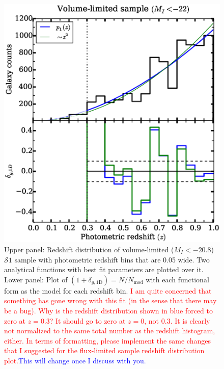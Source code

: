 \documentclass[twocolumn,useAMS,usenatbib]{mn2e}
\newcommand{\rachel}[1]{{\textcolor{red}{#1}}}
\newcommand{\arun}[1]{{\textcolor{blue}{#1}}}
\newcommand{\s}{\ensuremath{\mathcal{S}}}
\begin{document}
\begin{figure}
 \centering
  \includegraphics[width=\columnwidth]{redshift_vollimited}
  \caption{
Upper panel: Redshift distribution of volume-limited ($M_I <  -20.8$)
\s$1$ sample with photometric redshift bins that are 0.05 wide. Two
analytical functions with best fit parameters are plotted over it. 
           Lower panel: Plot of $(1+\delta_{g,\text{1D}}) =
           N/N_{\text{mod}}$ with each functional form as the model
           for each redshift bin. \rachel{I am quite concerned that
             something has gone wrong with this fit (in the sense that
           there may be a bug).  Why is the redshift distribution
           shown in blue forced to zero at $z=0.3$?  It should go to
           zero at $z=0$, not $0.3$.  It is clearly not normalized to the same total number as the redshift histogram, either.  In terms of formatting, please
           implement the same changes that I suggested for the
           flux-limited sample redshift distribution plot.}\arun{This will change once I discuss with you.}} 
  \label{fig:redshift_vollimited}
\end{figure}

  
\end{document}
